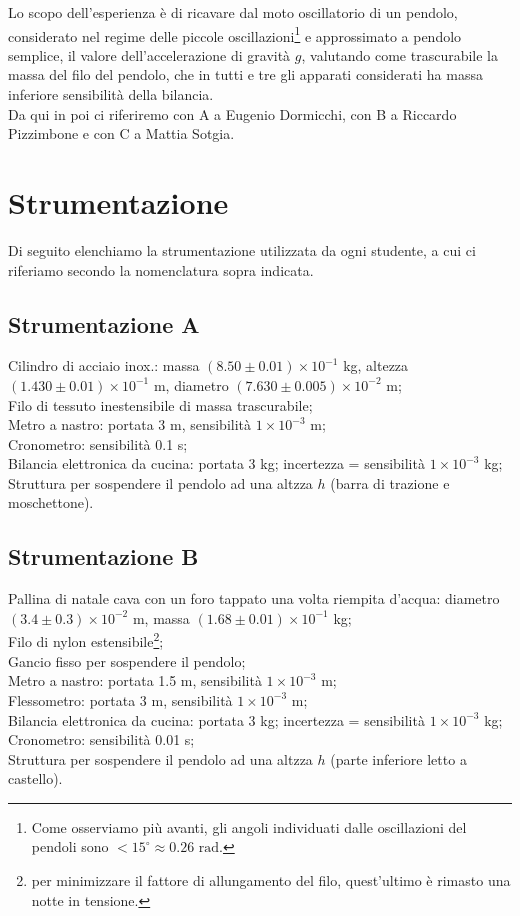 \documentclass[italian, a4paper, 10pt, twocolumn]{../../style/lab_unige}
\begin{document}
  Lo scopo dell'esperienza è di ricavare dal moto oscillatorio di un pendolo, considerato nel regime delle 
  piccole oscillazioni\footnote{Come osserviamo più avanti, gli angoli 
  individuati dalle oscillazioni del pendoli sono $<15^\circ\approx0.26\text{ rad}$.} 
  e approssimato a pendolo semplice, il valore dell'accelerazione di gravità $g$, valutando come 
  trascurabile la massa del filo del pendolo, che in tutti e tre gli apparati considerati ha massa inferiore
  sensibilità della bilancia.
  \\

  Da qui in poi ci riferiremo con A a Eugenio Dormicchi, con B a Riccardo Pizzimbone e con C a
  Mattia Sotgia.

  \section{Strumentazione}
  Di seguito elenchiamo la strumentazione utilizzata da ogni studente, a cui ci riferiamo secondo la 
  nomenclatura sopra indicata.

  \subsection{Strumentazione A}
  Cilindro di acciaio inox.: massa $(8.50\pm0.01)\times10^{-1}$ kg, altezza $(1.430\pm0.01)\times10^{-1}$ m, 
  diametro $(7.630\pm0.005)\times10^{-2}$ m;\\
  Filo di tessuto inestensibile di massa trascurabile;\\
  Metro a nastro: portata 3 m, sensibilità $1\times10^{-3}$ m;\\
  Cronometro: sensibilità 0.1 s;\\
  Bilancia elettronica da cucina: portata 3 kg; incertezza = sensibilità $1\times10^{-3}$ kg;\\
  Struttura per sospendere il pendolo ad una altzza $h$ (barra di trazione e moschettone).\\

  \subsection{Strumentazione B}
  Pallina di natale cava con un foro tappato una volta riempita d'acqua: diametro $(3.4\pm0.3)\times10^{-2}$ m,
  massa $(1.68\pm0.01)\times10^{-1}$ kg;\\
  Filo di nylon estensibile\footnote{per minimizzare il fattore di allungamento del filo, quest'ultimo è 
  rimasto una notte in tensione.};\\
  Gancio fisso per sospendere il pendolo;\\
  Metro a nastro: portata 1.5 m, sensibilità $1\times10^{-3}$ m;\\
  Flessometro: portata 3 m, sensibilità $1\times10^{-3}$ m;\\
  Bilancia elettronica da cucina: portata 3 kg; incertezza = sensibilità $1\times10^{-3}$ kg;\\
  Cronometro: sensibilità 0.01 s;\\ 
  Struttura per sospendere il pendolo ad una altzza $h$ (parte inferiore letto a castello).\\
\end{document}
